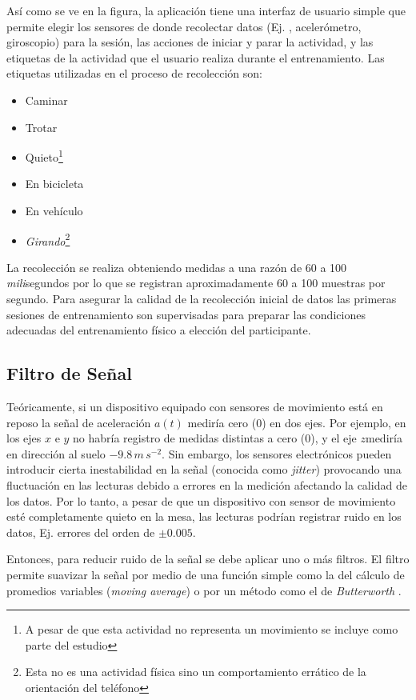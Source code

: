 Así como se ve en la figura, la aplicación tiene una interfaz de usuario
simple que permite elegir los sensores de donde recolectar datos (Ej.
, acelerómetro, giroscopio) para la sesión, las acciones
de iniciar y parar la actividad, y las etiquetas de la actividad que
el usuario realiza durante el entrenamiento. Las etiquetas utilizadas
en el proceso de recolección son:
\begin{itemize}
\item Caminar
\item Trotar
\item Quieto\footnote{A pesar de que esta actividad no representa un movimiento se incluye
como parte del estudio}
\item En bicicleta
\item En vehículo
\item \emph{Girando}\footnote{Esta no es una actividad física sino un comportamiento errático de
la orientación del teléfono}
\end{itemize}
La recolección se realiza obteniendo medidas a una razón de 60 a 100
\emph{mili}segundos por lo que se registran aproximadamente 60 a 100
muestras por segundo. Para asegurar la calidad de la recolección inicial
de datos las primeras sesiones de entrenamiento son supervisadas para
preparar las condiciones adecuadas del entrenamiento físico a elección
del participante.

\subsection{Filtro de Señal}

\label{ssec44:filtering}Teóricamente, si un dispositivo equipado
con sensores de movimiento está en reposo la señal de aceleración
$a(t)$ mediría cero (0) en dos ejes. Por ejemplo, en los ejes $x$
e $y$ no habría registro de medidas distintas a cero (0), y el eje
$z$mediría en dirección al suelo $-9.8\,m\,s^{-2}$. Sin embargo,
los sensores electrónicos pueden introducir cierta inestabilidad en
la señal (conocida como \emph{jitter}) provocando una fluctuación
en las lecturas debido a errores en la medición afectando la calidad
de los datos. Por lo tanto, a pesar de que un dispositivo con sensor
de movimiento esté completamente quieto en la mesa, las lecturas podrían
registrar ruido en los datos, Ej. errores del orden de $\pm0.005$. 

Entonces, para reducir ruido de la señal se debe aplicar uno o más
filtros. El filtro permite suavizar la señal por medio de una función
simple como la del cálculo de promedios variables (\emph{moving average})
o por un método como el de \emph{Butterworth} \cite{ReyesOrtiz2015}. 


